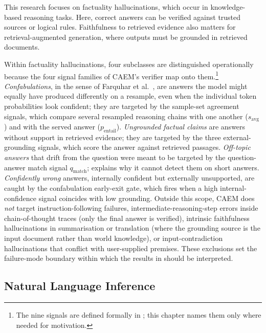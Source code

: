 This research focuses on factuality hallucinations, which occur in knowledge-based reasoning tasks. Here, correct answers can be verified against trusted sources or logical rules. Faithfulness to retrieved evidence also matters for retrieval-augmented generation, where outputs must be grounded in retrieved documents.

Within factuality hallucinations, four subclasses are distinguished operationally because the four signal families of CAEM's verifier map onto them.\footnote{The nine signals are defined formally in ; this chapter names them only where needed for motivation.} \textit{Confabulations}, in the sense of Farquhar et al.~\cite{farquhar2024semantic}, are answers the model might equally have produced differently on a resample, even when the individual token probabilities look confident; they are targeted by the sample-set agreement signals, which compare several resampled reasoning chains with one another ($s_{\text{avg}}$) and with the served answer ($p_{\text{entail}}$). \textit{Ungrounded factual claims} are answers without support in retrieved evidence; they are targeted by the three external-grounding signals, which score the answer against retrieved passages. \textit{Off-topic answers} that drift from the question were meant to be targeted by the question-answer match signal $q_{\text{match}}$;  explains why it cannot detect them on short answers. \textit{Confidently wrong} answers, internally confident but externally unsupported, are caught by the confabulation early-exit gate, which fires when a high internal-confidence signal coincides with low grounding. Outside this scope, CAEM does \textit{not} target instruction-following failures, intermediate-reasoning-step errors inside chain-of-thought traces (only the final answer is verified), intrinsic faithfulness hallucinations in summarisation or translation (where the grounding source is the input document rather than world knowledge), or input-contradiction hallucinations that conflict with user-supplied premises. These exclusions set the failure-mode boundary within which the results in  should be interpreted.

\subsection{Natural Language Inference}

